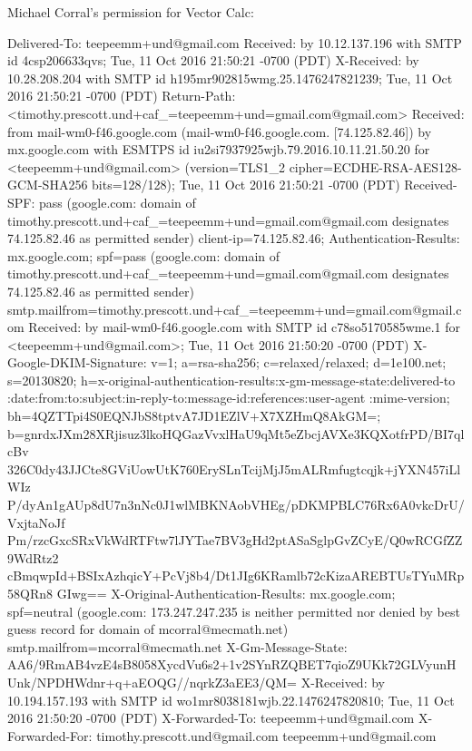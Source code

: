 \begin{itemize}
\begin{itemize}
Michael Corral's permission for Vector Calc:

Delivered-To: teepeemm+und@gmail.com
Received: by 10.12.137.196 with SMTP id 4csp206633qvs;
        Tue, 11 Oct 2016 21:50:21 -0700 (PDT)
X-Received: by 10.28.208.204 with SMTP id h195mr902815wmg.25.1476247821239;
        Tue, 11 Oct 2016 21:50:21 -0700 (PDT)
Return-Path: <timothy.prescott.und+caf_=teepeemm+und=gmail.com@gmail.com>
Received: from mail-wm0-f46.google.com (mail-wm0-f46.google.com. [74.125.82.46])
        by mx.google.com with ESMTPS id iu2si7937925wjb.79.2016.10.11.21.50.20
        for <teepeemm+und@gmail.com>
        (version=TLS1_2 cipher=ECDHE-RSA-AES128-GCM-SHA256 bits=128/128);
        Tue, 11 Oct 2016 21:50:21 -0700 (PDT)
Received-SPF: pass (google.com: domain of timothy.prescott.und+caf_=teepeemm+und=gmail.com@gmail.com designates 74.125.82.46 as permitted sender) client-ip=74.125.82.46;
Authentication-Results: mx.google.com;
       spf=pass (google.com: domain of timothy.prescott.und+caf_=teepeemm+und=gmail.com@gmail.com designates 74.125.82.46 as permitted sender) smtp.mailfrom=timothy.prescott.und+caf_=teepeemm+und=gmail.com@gmail.com
Received: by mail-wm0-f46.google.com with SMTP id c78so5170585wme.1
        for <teepeemm+und@gmail.com>; Tue, 11 Oct 2016 21:50:20 -0700 (PDT)
X-Google-DKIM-Signature: v=1; a=rsa-sha256; c=relaxed/relaxed;
        d=1e100.net; s=20130820;
        h=x-original-authentication-results:x-gm-message-state:delivered-to
         :date:from:to:subject:in-reply-to:message-id:references:user-agent
         :mime-version;
        bh=4QZTTpi4S0EQNJbS8tptvA7JD1EZlV+X7XZHmQ8AkGM=;
        b=gnrdxJXm28XRjisuz3lkoHQGazVvxlHaU9qMt5eZbcjAVXe3KQXotfrPD/BI7qlcBv
         326C0dy43JJCte8GViUowUtK760ErySLnTcijMjJ5mALRmfugtcqjk+jYXN457iLlWIz
         P/dyAn1gAUp8dU7n3nNc0J1wlMBKNAobVHEg/pDKMPBLC76Rx6A0vkcDrU/VxjtaNoJf
         Pm/rzcGxcSRxVkWdRTFtw7lJYTae7BV3gHd2ptASaSglpGvZCyE/Q0wRCGfZZ9WdRtz2
         cBmqwpId+BSIxAzhqicY+PcVj8b4/Dt1JIg6KRamlb72cKizaAREBTUsTYuMRp58QRn8
         GIwg==
X-Original-Authentication-Results: mx.google.com;
       spf=neutral (google.com: 173.247.247.235 is neither permitted nor denied by best guess record for domain of mcorral@mecmath.net) smtp.mailfrom=mcorral@mecmath.net
X-Gm-Message-State: AA6/9RmAB4vzE4sB8058XycdVu6s2+1v2SYnRZQBET7qioZ9UKk72GLVyunHUnk/NPDHWdnr+q+aEOQG//nqrkZ3aEE3/QM=
X-Received: by 10.194.157.193 with SMTP id wo1mr8038181wjb.22.1476247820810;
        Tue, 11 Oct 2016 21:50:20 -0700 (PDT)
X-Forwarded-To: teepeemm+und@gmail.com
X-Forwarded-For: timothy.prescott.und@gmail.com teepeemm+und@gmail.com

\end{itemize}
\end{itemize}
